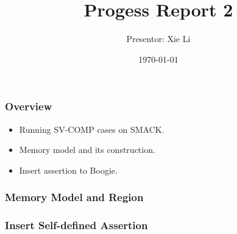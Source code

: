 \documentclass[11pt]{beamer}
\title{Progess Report 2}
\date{\today}
\author{Presentor: Xie Li}
\begin{document}
\maketitle

\begin{frame}\frametitle{Overview}
\begin{itemize}
\item Running SV-COMP cases on SMACK.
\item Memory model and its construction.
\item Insert assertion to Boogie.
\end{itemize}
\end{frame}

\begin{frame}\frametitle{}

\end{frame}


\begin{frame}\frametitle{Memory Model and Region}

\end{frame}

\begin{frame}\frametitle{Insert Self-defined Assertion}

\end{frame}
\end{document}
